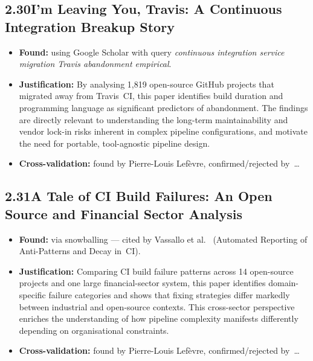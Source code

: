 \documentclass[a4paper,11pt]{article}
\begin{document}
\subsection*{2.30\quad I'm Leaving You, Travis: A Continuous Integration Breakup Story~\cite{widder2018leaving}}

\begin{itemize}[leftmargin=1.5em]
  \item \textbf{Found:} using Google Scholar with query \textit{continuous integration service migration Travis abandonment empirical}.
  \item \textbf{Justification:} By analysing 1,819 open-source GitHub projects that migrated away from Travis~CI, this paper identifies build duration and programming language as significant predictors of abandonment. The findings are directly relevant to understanding the long-term maintainability and vendor lock-in risks inherent in complex pipeline configurations, and motivate the need for portable, tool-agnostic pipeline design.
  \item \textbf{Cross-validation:} found by Pierre-Louis Lef\`evre, confirmed/rejected by~\ldots
\end{itemize}

\subsection*{2.31\quad A Tale of CI Build Failures: An Open Source and Financial Sector Analysis~\cite{vassallo2017tale}}

\begin{itemize}[leftmargin=1.5em]
  \item \textbf{Found:} via snowballing --- cited by Vassallo et al.~\cite{vassallo2019automated} (Automated Reporting of Anti-Patterns and Decay in~CI).
  \item \textbf{Justification:} Comparing CI build failure patterns across 14 open-source projects and one large financial-sector system, this paper identifies domain-specific failure categories and shows that fixing strategies differ markedly between industrial and open-source contexts. This cross-sector perspective enriches the understanding of how pipeline complexity manifests differently depending on organisational constraints.
  \item \textbf{Cross-validation:} found by Pierre-Louis Lef\`evre, confirmed/rejected by~\ldots
\end{itemize}
\end{document}
